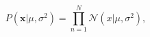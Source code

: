 \begin{equation}
\label{eq:likelihoodgaussian}
P(\mathbf{x} | \mu, \sigma^2) = \prod_{n = 1}^{N} \mathcal{N}(x | \mu,
\sigma^2),
\end{equation}